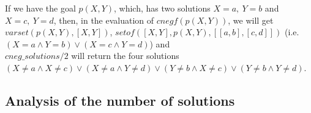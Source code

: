 \documentclass{tlp}
\newtheorem{definition}{Definition} %
\newcommand{\entails}{\models}
\newcommand{\vecy}{\overline{y}}
\begin{document}
If we have the goal $p(X,Y)$, which, has two solutions $X=a,~Y=b$ and
$X=c,~Y=d$, then, in the evaluation of $cnegf(p(X,Y))$, we will get
$varset(p(X,Y),[X,Y])$, $setof([X,Y],p(X,Y),[[a,b],[c,d]])$
(i.e. $(X=a \wedge Y=b) \vee (X=c \wedge Y=d)$) and \\$cneg\_solutions/2$
will return the four solutions $(X \neq a \wedge X \neq c) \vee (X
\neq a \wedge Y \neq d) \vee (Y \neq b \wedge X \neq c) \vee (Y \neq b
\wedge Y \neq d)$.








\vspace{-0.1in}

\subsection{Analysis of the number of solutions}
\label{cneg:finite_analysis}
\end{document}
